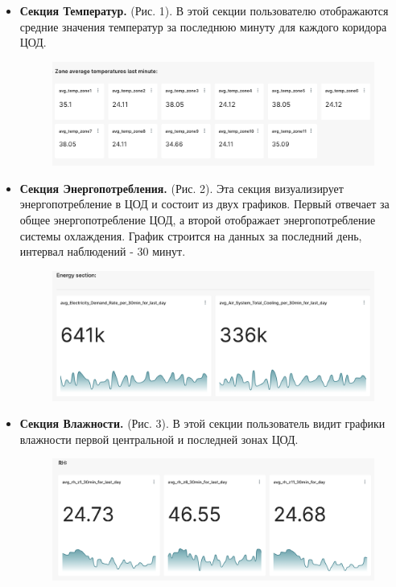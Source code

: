 \documentclass{article}
\begin{document}
\begin{itemize}
\item {\textbf{Секция Температур.} (Рис. 1). В этой секции пользователю отображаются средние значения температур за последнюю минуту для каждого коридора ЦОД.

\begin{figure}[hbt!]
\centering
\includegraphics[width=0.9\linewidth]{figures/temp_section.png}
\end{figure}
}

\item {\textbf{Секция Энергопотребления.} (Рис. 2). Эта секция визуализирует энергопотребление в ЦОД и состоит из двух графиков. Первый отвечает за общее энергопотребление ЦОД, а второй отображает энергопотребление системы охлаждения. График строится на данных за последний день, интервал наблюдений - 30 минут.

\begin{figure}[hbt!]
\centering
\includegraphics[width=0.9\linewidth]{figures/energy_section.png}
\end{figure}
}

\item {\textbf{Секция Влажности.} (Рис. 3). В этой секции пользователь видит графики влажности первой центральной и последней зонах ЦОД.

\begin{figure}[hbt!]
\centering
\includegraphics[width=0.9\linewidth]{figures/rh_section.png}
\end{figure}
}


\end{itemize}
\end{document}
